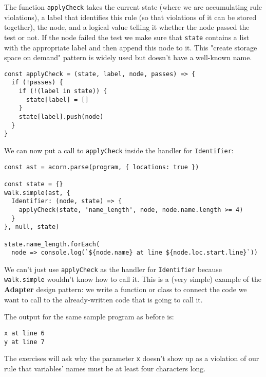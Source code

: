 \documentclass[krantzl]{krantz}
\newcommand{\glossref}[1]{\textbf{#1}}
\begin{document}
The function  \texttt{applyCheck} takes the current state (where we are accumulating rule violations),
a label that identifies this rule (so that violations of it can be stored together),
the node,
and a logical value telling it whether the node passed the test or not.
If the node failed the test
we make sure that \texttt{state} contains a list with the appropriate label
and then append this node to it.
This "create storage space on demand" pattern
is widely used but doesn't have a well-known name.


\begin{lstlisting}[frame=single,frameround=tttt]
const applyCheck = (state, label, node, passes) => {
  if (!passes) {
    if (!(label in state)) {
      state[label] = []
    }
    state[label].push(node)
  }
}
\end{lstlisting}



We can now put a call to \texttt{applyCheck} inside the handler for \texttt{Identifier}:


\begin{lstlisting}[frame=single,frameround=tttt]
const ast = acorn.parse(program, { locations: true })

const state = {}
walk.simple(ast, {
  Identifier: (node, state) => {
    applyCheck(state, 'name_length', node, node.name.length >= 4)
  }
}, null, state)

state.name_length.forEach(
  node => console.log(`${node.name} at line ${node.loc.start.line}`))
\end{lstlisting}



\noindent We can't just use \texttt{applyCheck} as the handler for \texttt{Identifier}
because \texttt{walk.simple} wouldn't know how to call it.
This is a (very simple) example of the \glossref{Adapter} design pattern:
we write a function or class to connect the code we want to call
to the already-written code that is going to call it.


The output for the same sample program as before is:


\begin{lstlisting}[frame=single,frameround=tttt]
x at line 6
y at line 7
\end{lstlisting}



\noindent The exercises will ask why the parameter \texttt{x} doesn't show up
as a violation of our rule
that variables' names must be at least four characters long.
\end{document}
